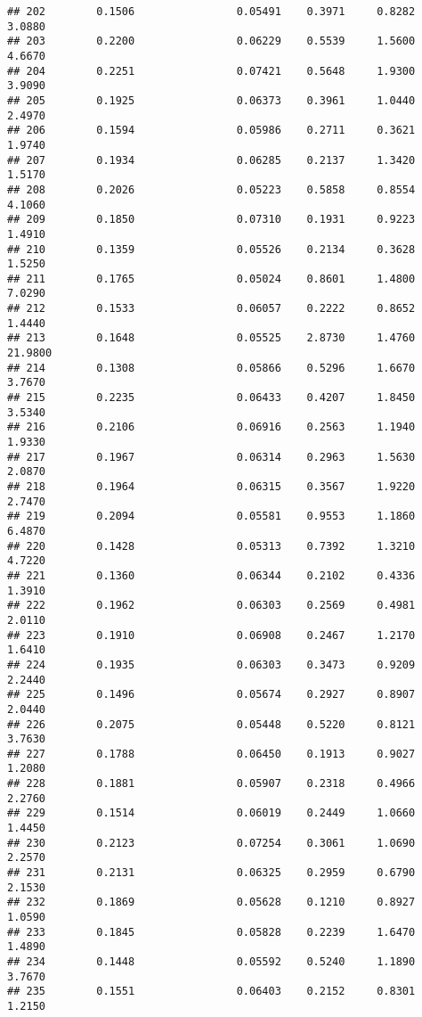 \documentclass[
]{article}
\begin{document}
\begin{verbatim}
## 202        0.1506                0.05491    0.3971     0.8282       3.0880
## 203        0.2200                0.06229    0.5539     1.5600       4.6670
## 204        0.2251                0.07421    0.5648     1.9300       3.9090
## 205        0.1925                0.06373    0.3961     1.0440       2.4970
## 206        0.1594                0.05986    0.2711     0.3621       1.9740
## 207        0.1934                0.06285    0.2137     1.3420       1.5170
## 208        0.2026                0.05223    0.5858     0.8554       4.1060
## 209        0.1850                0.07310    0.1931     0.9223       1.4910
## 210        0.1359                0.05526    0.2134     0.3628       1.5250
## 211        0.1765                0.05024    0.8601     1.4800       7.0290
## 212        0.1533                0.06057    0.2222     0.8652       1.4440
## 213        0.1648                0.05525    2.8730     1.4760      21.9800
## 214        0.1308                0.05866    0.5296     1.6670       3.7670
## 215        0.2235                0.06433    0.4207     1.8450       3.5340
## 216        0.2106                0.06916    0.2563     1.1940       1.9330
## 217        0.1967                0.06314    0.2963     1.5630       2.0870
## 218        0.1964                0.06315    0.3567     1.9220       2.7470
## 219        0.2094                0.05581    0.9553     1.1860       6.4870
## 220        0.1428                0.05313    0.7392     1.3210       4.7220
## 221        0.1360                0.06344    0.2102     0.4336       1.3910
## 222        0.1962                0.06303    0.2569     0.4981       2.0110
## 223        0.1910                0.06908    0.2467     1.2170       1.6410
## 224        0.1935                0.06303    0.3473     0.9209       2.2440
## 225        0.1496                0.05674    0.2927     0.8907       2.0440
## 226        0.2075                0.05448    0.5220     0.8121       3.7630
## 227        0.1788                0.06450    0.1913     0.9027       1.2080
## 228        0.1881                0.05907    0.2318     0.4966       2.2760
## 229        0.1514                0.06019    0.2449     1.0660       1.4450
## 230        0.2123                0.07254    0.3061     1.0690       2.2570
## 231        0.2131                0.06325    0.2959     0.6790       2.1530
## 232        0.1869                0.05628    0.1210     0.8927       1.0590
## 233        0.1845                0.05828    0.2239     1.6470       1.4890
## 234        0.1448                0.05592    0.5240     1.1890       3.7670
## 235        0.1551                0.06403    0.2152     0.8301       1.2150

\end{verbatim}
\end{document}

